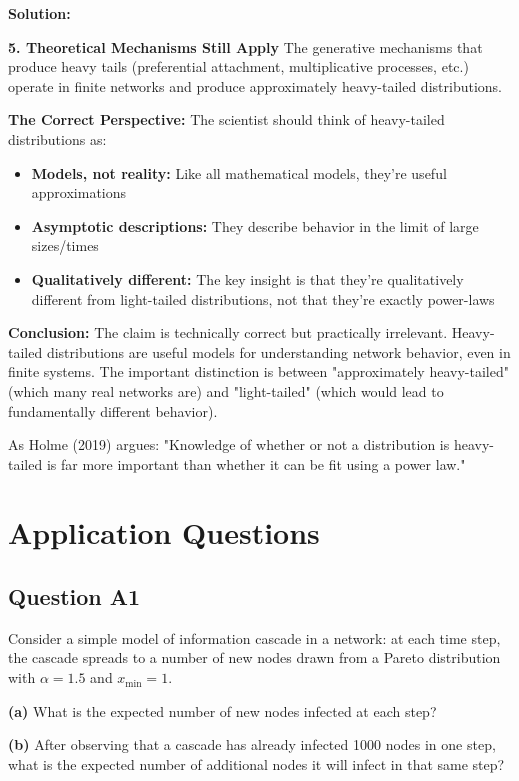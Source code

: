 \documentclass[11pt]{article}
\newenvironment{solution}
{\color{solutioncolor}\begin{framed}\textbf{Solution:}\par}
{\end{framed}}
\begin{document}
\begin{solution}
\textbf{5. Theoretical Mechanisms Still Apply}
The generative mechanisms that produce heavy tails (preferential attachment, multiplicative processes, etc.) operate in finite networks and produce approximately heavy-tailed distributions.

\textbf{The Correct Perspective:}
The scientist should think of heavy-tailed distributions as:
\begin{itemize}
\item \textbf{Models, not reality:} Like all mathematical models, they're useful approximations
\item \textbf{Asymptotic descriptions:} They describe behavior in the limit of large sizes/times
\item \textbf{Qualitatively different:} The key insight is that they're qualitatively different from light-tailed distributions, not that they're exactly power-laws
\end{itemize}

\textbf{Conclusion:}
The claim is technically correct but practically irrelevant. Heavy-tailed distributions are useful models for understanding network behavior, even in finite systems. The important distinction is between "approximately heavy-tailed" (which many real networks are) and "light-tailed" (which would lead to fundamentally different behavior).

As Holme (2019) argues: "Knowledge of whether or not a distribution is heavy-tailed is far more important than whether it can be fit using a power law."
\end{solution}

\section{Application Questions}

\subsection{Question A1}
Consider a simple model of information cascade in a network: at each time step, the cascade spreads to a number of new nodes drawn from a Pareto distribution with $\alpha = 1.5$ and $x_{\min} = 1$.

\textbf{(a)} What is the expected number of new nodes infected at each step?

\textbf{(b)} After observing that a cascade has already infected 1000 nodes in one step, what is the expected number of additional nodes it will infect in that same step?
\end{document}
